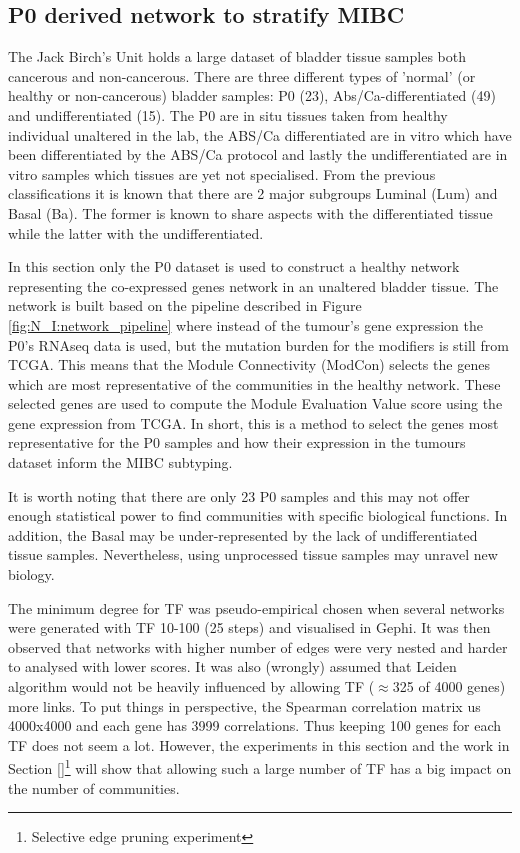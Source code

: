 

\subsection{P0 derived network to stratify MIBC} \label{s:p0}

 
The Jack Birch's Unit holds a large dataset of bladder tissue samples both cancerous and non-cancerous. There are three different types of 'normal'  (or healthy or non-cancerous) bladder samples: P0 (23), Abs/Ca-differentiated (49) and undifferentiated (15). The P0 are in situ tissues taken from healthy individual unaltered in the lab, the ABS/Ca differentiated are in vitro which have been differentiated by the ABS/Ca protocol and lastly the undifferentiated are in vitro samples which tissues are yet not specialised. From the previous classifications \citet{Robertson2017-mg, Kamoun2020-tj} it is known that there are 2 major subgroups Luminal (Lum) and Basal (Ba). The former is known to share aspects with the differentiated tissue while the latter with the undifferentiated. 

In this section only the P0 dataset is used to construct a healthy network representing the co-expressed genes network in an unaltered bladder tissue. The network is built based on the pipeline described in Figure \ref{fig:N_I:network_pipeline} where instead of the tumour's gene expression the P0's RNAseq data is used, but the mutation burden for the modifiers is still from TCGA. This means that the Module Connectivity (ModCon) selects the genes which are most representative of the communities in the healthy network. These selected genes are used to compute the Module Evaluation Value score using the gene expression from TCGA. In short, this is a method to select the genes most representative for the P0 samples and how their expression in the tumours dataset inform the MIBC subtyping. 

It is worth noting that there are only 23 P0 samples and this may not offer enough statistical power to find communities with specific biological functions. In addition, the Basal may be under-represented by the lack of undifferentiated tissue samples. Nevertheless, using unprocessed tissue samples may unravel new biology.

The minimum degree for TF was pseudo-empirical chosen when several networks were generated with TF 10-100 (25 steps) and visualised in Gephi. It was then observed that networks with higher number of edges were very nested and harder to analysed with lower scores. It was also (wrongly) assumed that Leiden algorithm would not be heavily influenced by allowing TF ($\approx$325 of 4000 genes) more links. To put things in perspective, the Spearman correlation matrix us 4000x4000 and each gene has 3999 correlations. Thus keeping 100 genes for each TF does not seem a lot. However, the experiments in this section and the work in Section \ref{}\footnote{Selective edge pruning experiment} will show that allowing such a large number of TF has a big impact on the number of communities.

